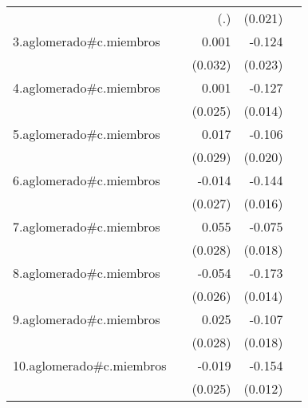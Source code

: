 {\begin{longtable}{l*{4}{D{.}{.}{-1}}}
            &                     &         (.)         &     (0.021)         &                     \\
\addlinespace
3.aglomerado#c.miembros&                     &       0.001         &      -0.124\sym{***}&                     \\
            &                     &     (0.032)         &     (0.023)         &                     \\
\addlinespace
4.aglomerado#c.miembros&                     &       0.001         &      -0.127\sym{***}&                     \\
            &                     &     (0.025)         &     (0.014)         &                     \\
\addlinespace
5.aglomerado#c.miembros&                     &       0.017         &      -0.106\sym{***}&                     \\
            &                     &     (0.029)         &     (0.020)         &                     \\
\addlinespace
6.aglomerado#c.miembros&                     &      -0.014         &      -0.144\sym{***}&                     \\
            &                     &     (0.027)         &     (0.016)         &                     \\
\addlinespace
7.aglomerado#c.miembros&                     &       0.055         &      -0.075\sym{***}&                     \\
            &                     &     (0.028)         &     (0.018)         &                     \\
\addlinespace
8.aglomerado#c.miembros&                     &      -0.054\sym{*}  &      -0.173\sym{***}&                     \\
            &                     &     (0.026)         &     (0.014)         &                     \\
\addlinespace
9.aglomerado#c.miembros&                     &       0.025         &      -0.107\sym{***}&                     \\
            &                     &     (0.028)         &     (0.018)         &                     \\
\addlinespace
10.aglomerado#c.miembros&                     &      -0.019         &      -0.154\sym{***}&                     \\
            &                     &     (0.025)         &     (0.012)         &                     \\

\end{longtable}}
